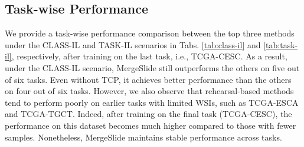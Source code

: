 \documentclass[10pt,twocolumn,letterpaper]{article}
\begin{document}
\begin{table}[!http]
\caption{Comparison between two strategies for MLP: Trainable MLP and MLP-Free on the sequence of \textcolor{blue}{B}$\rightarrow$\textcolor{blue}{R}$\rightarrow$\textcolor{blue}{N}$\rightarrow$\textcolor{red}{E}$\rightarrow$\textcolor{red}{T}$\rightarrow$\textcolor{red}{C}.}
\label{tab:mlp}

\end{table}

\subsection{Task-wise Performance} We provide a task-wise performance comparison between the top three methods under the CLASS-IL and TASK-IL scenarios in Tabs. \ref{tab:class-il} and \ref{tab:task-il}, respectively, after training on the last task, i.e., TCGA-CESC. As a result, under the CLASS-IL scenario, MergeSlide still outperforms the others on five out of six tasks. Even without TCP, it achieves better performance than the others on four out of six tasks. However, we also observe that rehearsal-based methods tend to perform poorly on earlier tasks with limited WSIs, such as TCGA-ESCA and TCGA-TGCT. Indeed, after training on the final task (TCGA-CESC), the performance on this dataset becomes much higher compared to those with fewer samples. Nonetheless, MergeSlide maintains stable performance across tasks.
\end{document}

